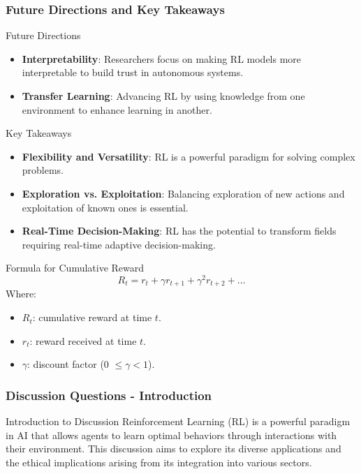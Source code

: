 \documentclass[aspectratio=169]{beamer}
\begin{document}
\begin{frame}[fragile]
    \frametitle{Future Directions and Key Takeaways}
    \begin{block}{Future Directions}
        \begin{itemize}
            \item \textbf{Interpretability}: Researchers focus on making RL models more interpretable to build trust in autonomous systems.
            \item \textbf{Transfer Learning}: Advancing RL by using knowledge from one environment to enhance learning in another.
        \end{itemize}
    \end{block}

    \begin{block}{Key Takeaways}
        \begin{itemize}
            \item \textbf{Flexibility and Versatility}: RL is a powerful paradigm for solving complex problems.
            \item \textbf{Exploration vs. Exploitation}: Balancing exploration of new actions and exploitation of known ones is essential.
            \item \textbf{Real-Time Decision-Making}: RL has the potential to transform fields requiring real-time adaptive decision-making.
        \end{itemize}
    \end{block}
    
    \begin{block}{Formula for Cumulative Reward}
        \begin{equation}
        R_t = r_t + \gamma r_{t+1} + \gamma^2 r_{t+2} + \ldots
        \end{equation}
        Where:
        \begin{itemize}
            \item $R_t$: cumulative reward at time $t$.
            \item $r_t$: reward received at time $t$.
            \item $\gamma$: discount factor (0 $\leq \gamma < 1$).
        \end{itemize}
    \end{block}
\end{frame}

\begin{frame}[fragile]
  \frametitle{Discussion Questions - Introduction}
  \begin{block}{Introduction to Discussion}
    Reinforcement Learning (RL) is a powerful paradigm in AI that allows agents to learn optimal behaviors through interactions with their environment. This discussion aims to explore its diverse applications and the ethical implications arising from its integration into various sectors.
  \end{block}
\end{frame}
\end{document}
